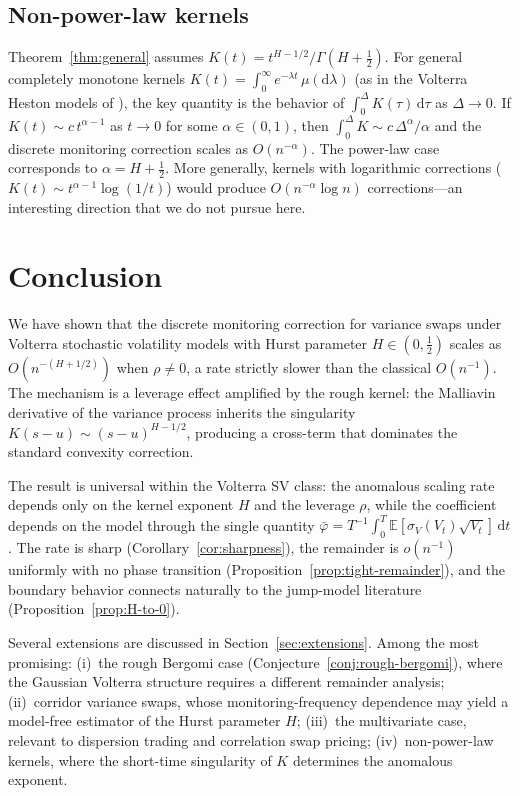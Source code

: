 \documentclass[12pt]{article}
\theoremstyle{definition}
\newcommand{\E}{\mathbb{E}}
\newcommand{\dd}{\mathrm{d}}
\begin{document}
\subsection{Non-power-law kernels}

Theorem~\ref{thm:general} assumes $K(t) = t^{H-1/2}/\Gamma(H+\tfrac12)$.
For general completely monotone kernels
$K(t) = \int_0^\infty e^{-\lambda t}\,\mu(\dd\lambda)$
(as in the Volterra Heston models of
\citealt{AbiJaberLarssonPulido2021}), the key quantity is the
behavior of $\int_0^\Delta K(\tau)\,\dd\tau$ as $\Delta \to 0$.
If $K(t) \sim c\,t^{\alpha-1}$ as $t \to 0$ for some $\alpha \in (0,1)$,
then $\int_0^\Delta K \sim c\,\Delta^\alpha/\alpha$ and the discrete
monitoring correction scales as $O(n^{-\alpha})$.
The power-law case corresponds to $\alpha = H + \tfrac12$.
More generally, kernels with logarithmic corrections
($K(t) \sim t^{\alpha-1}\log(1/t)$) would produce
$O(n^{-\alpha}\log n)$ corrections---an interesting direction
that we do not pursue here.

\section{Conclusion}\label{sec:conclusion}

We have shown that the discrete monitoring correction for variance
swaps under Volterra stochastic volatility models with Hurst parameter
$H \in (0,\tfrac12)$ scales as $O(n^{-(H+1/2)})$ when $\rho \neq 0$,
a rate strictly slower than the classical $O(n^{-1})$.
The mechanism is a leverage effect amplified by the rough kernel:
the Malliavin derivative of the variance process inherits the
singularity $K(s{-}u) \sim (s{-}u)^{H-1/2}$, producing a cross-term
that dominates the standard convexity correction.

The result is universal within the Volterra SV class: the anomalous
scaling rate depends only on the kernel exponent $H$ and the leverage
$\rho$, while the coefficient depends on the model through the single
quantity $\bar\varphi = T^{-1}\!\int_0^T\!\E[\sigma_V(V_t)\sqrt{V_t}]\,
\dd t$.
The rate is sharp (Corollary~\ref{cor:sharpness}), the remainder is
$o(n^{-1})$ uniformly with no phase transition
(Proposition~\ref{prop:tight-remainder}), and the boundary behavior
connects naturally to the jump-model literature
(Proposition~\ref{prop:H-to-0}).

Several extensions are discussed in Section~\ref{sec:extensions}.
Among the most promising:
(i)~the rough Bergomi case (Conjecture~\ref{conj:rough-bergomi}),
where the Gaussian Volterra structure requires a different remainder
analysis;
(ii)~corridor variance swaps, whose monitoring-frequency dependence
may yield a model-free estimator of the Hurst parameter $H$;
(iii)~the multivariate case, relevant to dispersion trading and
correlation swap pricing;
(iv)~non-power-law kernels, where the short-time singularity of $K$
determines the anomalous exponent.
\end{document}
